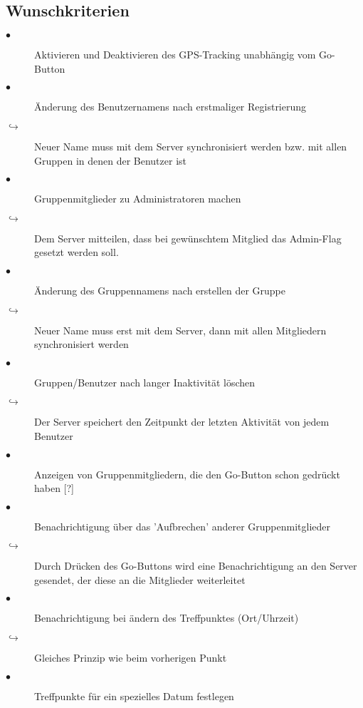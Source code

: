 \documentclass{article}
\begin{document}
\subsection{Wunschkriterien}
\begin{description}
\item[$\bullet$] Aktivieren und Deaktivieren des GPS-Tracking unabhängig vom Go-Button
\item[$\bullet$] Änderung des Benutzernamens nach erstmaliger Registrierung
\item[$\hookrightarrow$] Neuer Name muss mit dem Server synchronisiert werden bzw. mit allen Gruppen in denen der Benutzer ist
\item[$\bullet$] Gruppenmitglieder zu Administratoren machen
\item[$\hookrightarrow$] Dem Server mitteilen, dass bei gewünschtem Mitglied das Admin-Flag gesetzt werden soll.
\item[$\bullet$] Änderung des Gruppennamens nach erstellen der Gruppe
\item[$\hookrightarrow$] Neuer Name muss erst mit dem Server, dann mit allen Mitgliedern synchronisiert werden
\item[$\bullet$] Gruppen/Benutzer nach langer Inaktivität löschen
\item[$\hookrightarrow$] Der Server speichert den Zeitpunkt der letzten Aktivität von jedem Benutzer
\item[$\bullet$] Anzeigen von Gruppenmitgliedern, die den Go-Button schon gedrückt haben [?]
\item[$\bullet$] Benachrichtigung über das 'Aufbrechen' anderer Gruppenmitglieder
\item[$\hookrightarrow$] Durch Drücken des Go-Buttons wird eine Benachrichtigung an den Server gesendet, der diese an die Mitglieder weiterleitet
\item[$\bullet$] Benachrichtigung bei ändern des Treffpunktes (Ort/Uhrzeit)
\item[$\hookrightarrow$] Gleiches Prinzip wie beim vorherigen Punkt
\item[$\bullet$] Treffpunkte für ein spezielles Datum festlegen
\end{description}
\end{document}
